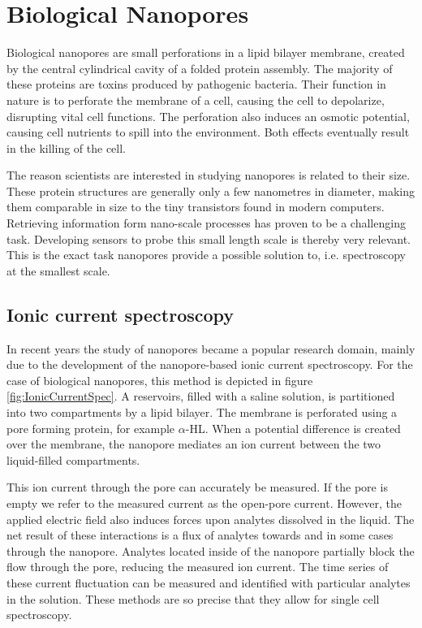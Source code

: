 \section{Biological Nanopores}

Biological nanopores are small perforations in a lipid bilayer membrane, created
by the central cylindrical cavity of a folded protein assembly. The majority of these
proteins are toxins produced by pathogenic bacteria. Their function in nature is to
perforate the membrane of a cell, causing the cell to depolarize, disrupting vital cell
functions. The perforation also induces an osmotic potential, causing cell nutrients to
spill into the environment. Both effects eventually result in the killing of the
cell.\cite{Peraro2016}

The reason scientists are interested in studying nanopores is related to their size.
These protein structures are generally only a few nanometres in diameter, making them
comparable in size to the tiny transistors found in modern computers. Retrieving
information form nano-scale processes has proven to be a challenging task. Developing
sensors to probe this small length scale is thereby very relevant. This is the exact task
nanopores provide a possible solution to, i.e. spectroscopy at the smallest
scale.

\subsection{Ionic current spectroscopy}

In recent years the study of nanopores became a popular research domain, mainly
due to the development of the nanopore-based ionic current spectroscopy. For the case of
biological nanopores, this method is depicted in figure \ref{fig:IonicCurrentSpec}. A
reservoirs, filled with a saline solution, is partitioned into two compartments by a
lipid bilayer. The membrane is perforated using a pore forming protein, for example
$\alpha$-HL.  When a potential difference is created over the membrane, the nanopore
mediates an ion current between the two liquid-filled compartments.

This ion current through the pore can accurately be measured. If the pore is empty we
refer to the measured current as the open-pore current. However, the applied electric
field also induces forces upon analytes dissolved in the liquid. The net result of these
interactions is a flux of analytes towards and in some cases through the nanopore.
Analytes located inside of the nanopore partially block the flow through the pore,
reducing the measured ion current. The time series of
these current fluctuation can be measured and identified with particular analytes in the
solution. These methods are so precise that they allow for single cell
spectroscopy.\cite{Howorka2009}

